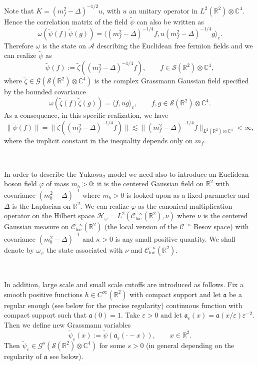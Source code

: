 \documentclass{article}
\newcommand{\assign}{:=}
\begin{document}
Note that $K = (m_f^2 - \Delta)^{- 1 / 2} u$, with $u$ an unitary operator in
$L^2 (\mathbb{R}^2) \otimes \mathbb{C}^4$. Hence the correlation matrix of the
field $\tilde{\psi}$ can also be written as
\[ \omega (\tilde{\psi} (f) \tilde{\psi} (g)) = \langle (m_f^2 - \Delta)^{- 1
   / 4} f, u (m_f^2 - \Delta)^{- 1 / 4} g \rangle_c . \]
Therefore $\omega$ is the state on $\mathcal{A}$ describing the Euclidean free
fermion fields and we can realize $\tilde{\psi}$ as
\[ \tilde{\psi} (f) \assign \tilde{\zeta} ((m_f^2 - \Delta)^{- 1 / 4} f),
   \qquad f \in \mathcal{S} (\mathbb{R}^2) \otimes \mathbb{C}^4, \]
where $\tilde{\zeta} \in \mathcal{G} (\mathcal{S} (\mathbb{R}^2) \otimes
\mathbb{C}^4)$ is the complex Grassmann Gaussian field specified by the
bounded covariance
\[ \omega (\tilde{\zeta} (f) \tilde{\zeta} (g)) = \langle f, u g \rangle_c,
   \qquad f, g \in \mathcal{S} (\mathbb{R}^2) \otimes \mathbb{C}^4 . \]
As a consequence, in this specific realization, we have
\begin{equation}
  \| \tilde{\psi} (f) \| = \| \tilde{\zeta} ((m_f^2 - \Delta)^{- 1 / 4} f) \|
  \lesssim \| (m_f^2 - \Delta)^{- 1 / 4} f \|_{L^2 (\mathbb{R}^2) \otimes
  \mathbb{C}^4} < \infty, \label{eq:dirac-reg}
\end{equation}
where the implicit constant in the inequality depends only on $m_f$.

\

In order to describe the Yukawa$_2$ model we need also to introduce an
Euclidean boson field $\varphi$ of mass $m_b > 0$: it is the centered Gaussian
field on $\mathbb{R}^2$ with covariance $(m^2_b - \Delta)^{- 1}$ where $m_b >
0$ is looked upon as a fixed parameter and $\Delta$ is the Laplacian on
$\mathbb{R}^2$. We can realize $\varphi$ as the canonical multiplication
operator on the Hilbert space $\mathcal{H}_{\varphi} = L^2 \left(
\mathcal{C}^{- \kappa}_{\text{loc}} (\mathbb{R}^2), \nu \right)$ where $\nu$
is the centered Gaussian measure on $\mathcal{C}^{- \kappa}_{\text{loc}}
(\mathbb{R}^2)$ (the local version of the $\mathcal{C}^{- \kappa}$ Besov
space) with covariance $(m^2_b - \Delta)^{- 1}$ and $\kappa > 0$ is any small
positive quantity. We shall denote by $\omega_{\varphi}$ the state associated
with $\nu$ and $\mathcal{C}^{- \kappa}_{\text{loc}} (\mathbb{R}^2)$.

\

In addition, large scale and small scale cutoffs are introduced as follows.
Fix a smooth positive functions $h \in C^{\infty} (\mathbb{R}^2)$ with compact
support and let $\mathfrak{a}$ be a regular enough (see below for the precise
regularity) continuous function with compact support such that $\mathfrak{a}
(0) = 1$. Take $\varepsilon > 0$ and let $\mathfrak{a}_{\varepsilon} (x) =
\mathfrak{a} (x / \varepsilon) \varepsilon^{- 2}$. Then we define new
Grassmann variables
\[ \tilde{\psi}_{\varepsilon} (x) \assign \tilde{\psi}
   (\mathfrak{a}_{\varepsilon} (\cdot - x)), \qquad x \in \mathbb{R}^2 . \]
Then $\tilde{\psi}_{\varepsilon} \in \mathcal{G}^s (\mathcal{S} (\mathbb{R}^2)
\otimes \mathbb{C}^4)$ for some $s > 0$ (in general depending on the
regularity of $\mathfrak{a}$ see below).
\end{document}
